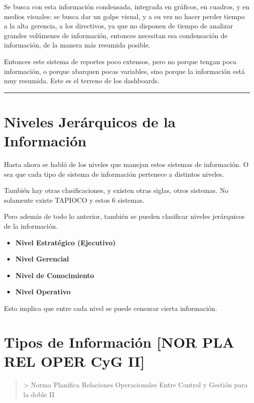 Se busca con esta información condensada, integrada en gráficos, en
cuadros, y en medios visuales: se busca dar un golpe visual, y a su vez
no hacer perder tiempo a la alta gerencia, a los directivos, ya que no
disponen de tiempo de analizar grandes volúmenes de información,
entonces necesitan esa condensación de información, de la manera más
resumida posible.

Entonces este sistema de reportes poco extensos, pero no porque tengan
poca información, o porque abarquen pocas variables, sino porque la
información está muy resumida. Este es el terreno de los dashboards.

\begin{center}\rule{0.5\linewidth}{0.5pt}\end{center}

\hypertarget{niveles-jeruxe1rquicos-de-la-informaciuxf3n}{%
\section{Niveles Jerárquicos de la
Información}\label{niveles-jeruxe1rquicos-de-la-informaciuxf3n}}

Hasta ahora se habló de los niveles que manejan estos sistemas de
información. O sea que cada tipo de sistema de información pertenece a
distintos niveles.

También hay otras clasificaciones, y existen otras siglas, otros
sistemas. No solamente existe TAPIOCO y estos 6 sistemas.

Pero además de todo lo anterior, también se pueden clasificar niveles
jerárquicos de la información.

\begin{itemize}
\item
  \textbf{Nivel Estratégico (Ejecutivo)}
\item
  \textbf{Nivel Gerencial}
\item
  \textbf{Nivel de Conocimiento}
\item
  \textbf{Nivel Operativo}
\end{itemize}

Esto implica que entre cada nivel se puede censurar cierta información.

\hypertarget{tipos-de-informaciuxf3n}{%
\section{Tipos de Información [NOR PLA REL OPER CyG II]}\label{tipos-de-informaciuxf3n}}

\begin{quote}
\textgreater{} Norma Planifica Relaciones
Operacionales Entre Control y Gestión para la doble II
\end{quote}

